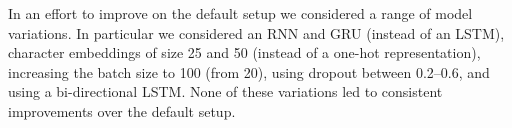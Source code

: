 \documentclass[11pt]{article}
\begin{document}










In an effort to improve on the default setup we considered a range of
model variations. In particular we considered an RNN and GRU (instead
of an LSTM), character embeddings of size 25 and 50 (instead of a
one-hot representation), increasing the batch size to 100 (from 20),
using dropout between 0.2--0.6, and using a bi-directional LSTM. None
of these variations led to consistent improvements over the default
setup.






\end{document}
